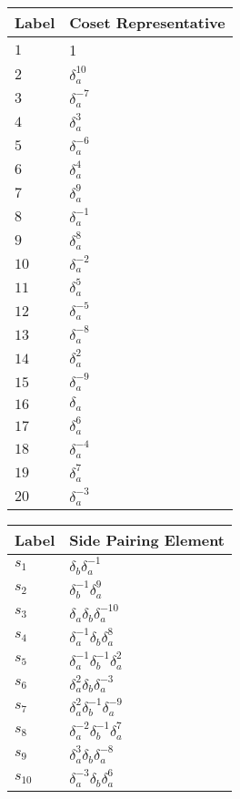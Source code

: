 \documentclass{article}
\begin{document}

\begin{center}
\begin{tabular}{ll}
\toprule
Label & Coset Representative\\
\midrule
$1$ & 1 \\
$2$ & $\delta_a^{10}$ \\
$3$ & $\delta_a^{-7}$ \\
$4$ & $\delta_a^{3}$ \\
$5$ & $\delta_a^{-6}$ \\
$6$ & $\delta_a^{4}$ \\
$7$ & $\delta_a^{9}$ \\
$8$ & $\delta_a^{-1}$ \\
$9$ & $\delta_a^{8}$ \\
$10$ & $\delta_a^{-2}$ \\
$11$ & $\delta_a^{5}$ \\
$12$ & $\delta_a^{-5}$ \\
$13$ & $\delta_a^{-8}$ \\
$14$ & $\delta_a^{2}$ \\
$15$ & $\delta_a^{-9}$ \\
$16$ & $\delta_a^{}$ \\
$17$ & $\delta_a^{6}$ \\
$18$ & $\delta_a^{-4}$ \\
$19$ & $\delta_a^{7}$ \\
$20$ & $\delta_a^{-3}$ \\
\bottomrule
\end{tabular}
\hfill
\begin{tabular}{ll}
\toprule
Label & Side Pairing Element\\
\midrule
$s_{1}$ & $\delta_b^{}\delta_a^{-1}$ \\
$s_{2}$ & $\delta_b^{-1}\delta_a^{9}$ \\
$s_{3}$ & $\delta_a^{}\delta_b^{}\delta_a^{-10}$ \\
$s_{4}$ & $\delta_a^{-1}\delta_b^{}\delta_a^{8}$ \\
$s_{5}$ & $\delta_a^{-1}\delta_b^{-1}\delta_a^{2}$ \\
$s_{6}$ & $\delta_a^{2}\delta_b^{}\delta_a^{-3}$ \\
$s_{7}$ & $\delta_a^{2}\delta_b^{-1}\delta_a^{-9}$ \\
$s_{8}$ & $\delta_a^{-2}\delta_b^{-1}\delta_a^{7}$ \\
$s_{9}$ & $\delta_a^{3}\delta_b^{}\delta_a^{-8}$ \\
$s_{10}$ & $\delta_a^{-3}\delta_b^{}\delta_a^{6}$ \\

\end{tabular}
\end{center}
\end{document}
